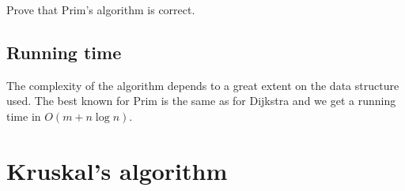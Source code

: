 \begin{Boxample}[18]
Prove that Prim's algorithm is correct.
%
%
%
\end{Boxample}

\subsection{Running time}
The complexity of the algorithm depends to a great extent on the data
structure used. The best known for Prim is the same as for Dijkstra
and we  get a running time in $O(m + n\log n)$.

\section{Kruskal's algorithm}


